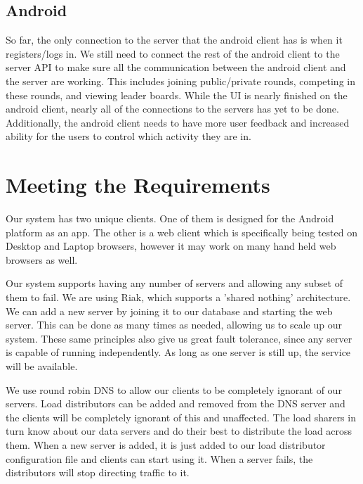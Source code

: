 \documentclass{dependencies/acm_proc_article-sp}
\begin{document}
\subsection {Android}
So far, the only connection to the server that the android client has is when it
registers/logs in. We still need to connect the rest of the android client to
the server API to make sure all the communication between the android client
and the server are working. This includes joining public/private rounds,
competing in these rounds, and viewing leader boards. While the UI is nearly
finished on the android client, nearly all of the connections to the servers
has yet to be done. Additionally, the android client needs to have more user
feedback and increased ability for the users to control which activity they
are in.
\section {Meeting the Requirements}

Our system has two unique clients. One of them is designed for the Android platform as an app.
The other is a web client which is specifically being tested on Desktop and Laptop
browsers, however it may work on many hand held web browsers as well.

Our system supports having any number of servers and allowing any subset of them to fail.
We are using Riak, which supports a 'shared nothing' architecture.  We can add a new server
by joining it to our database and starting the web server.  This can be done as many times
as needed, allowing us to scale up our system.  These same principles also give us great fault
tolerance, since any server is capable of running independently.  As long as one server is still
up, the service will be available.

We use round robin DNS to allow our clients to be completely ignorant of our servers.  Load distributors
can be added and removed from the DNS server and the clients will be completely ignorant of this
and unaffected.  The load sharers in turn know about our data servers and do their best to
distribute the load across them.  When a new server is added, it is just added to our load distributor
configuration file and clients can start using it.  When a server fails, the distributors will stop directing
traffic to it.
\end{document}
